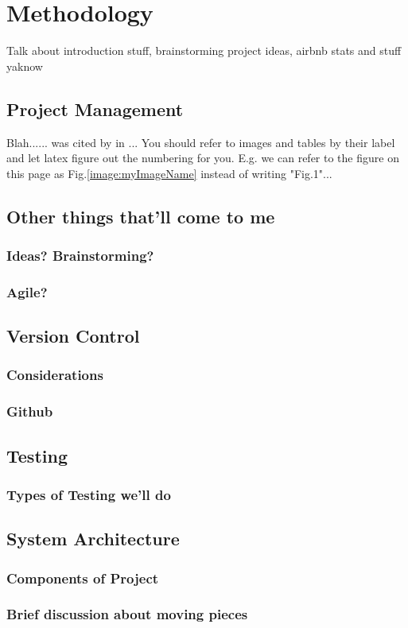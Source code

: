 \chapter{Methodology}
Talk about introduction stuff, brainstorming project ideas, airbnb stats and stuff yaknow 

\section{Project Management}
Blah...... was cited by \cite{zasloff2002antimicrobial} in ... You should refer to images and tables by their label and let latex figure out the numbering for you. E.g. we can refer to the figure on this page as Fig.\ref{image:myImageName} instead of writing "Fig.1"...

\section{Other things that'll come to me}
\subsection{Ideas? Brainstorming?}
\subsection{Agile?}

\section{Version Control}
\subsection{Considerations}
\subsection{Github}

\section{Testing}
\subsection{Types of Testing we'll do}

\section{System Architecture}
\subsection{Components of Project}
\subsection{Brief discussion about moving pieces}


